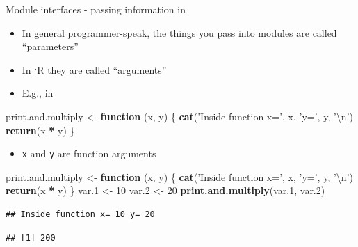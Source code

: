 \documentclass[ignorenonframetext,]{beamer}
\newenvironment{Shaded}{\begin{snugshade}}{\end{snugshade}}
\newcommand{\KeywordTok}[1]{\textcolor[rgb]{0.13,0.29,0.53}{\textbf{#1}}}
\newcommand{\DecValTok}[1]{\textcolor[rgb]{0.00,0.00,0.81}{#1}}
\newcommand{\CharTok}[1]{\textcolor[rgb]{0.31,0.60,0.02}{#1}}
\newcommand{\StringTok}[1]{\textcolor[rgb]{0.31,0.60,0.02}{#1}}
\newcommand{\ControlFlowTok}[1]{\textcolor[rgb]{0.13,0.29,0.53}{\textbf{#1}}}
\newcommand{\OperatorTok}[1]{\textcolor[rgb]{0.81,0.36,0.00}{\textbf{#1}}}
\newcommand{\NormalTok}[1]{#1}
\providecommand{\tightlist}{%
  \setlength{\itemsep}{0pt}\setlength{\parskip}{0pt}}
\begin{document}
\begin{frame}[fragile]{Module interfaces - passing information in}

\begin{itemize}[<+->]
\tightlist
\item
  In general programmer-speak, the things you pass into modules are
  called ``parameters''
\item
  In `R they are called ``arguments''
\item
  E.g., in
\end{itemize}

\begin{Shaded}
\begin{Highlighting}[]
\NormalTok{print.and.multiply <-}\StringTok{ }\ControlFlowTok{function}\NormalTok{ (x, y) \{}
    \KeywordTok{cat}\NormalTok{(}\StringTok{'Inside function x='}\NormalTok{, x, }\StringTok{'y='}\NormalTok{, y, }\StringTok{'}\CharTok{\textbackslash{}n}\StringTok{'}\NormalTok{)}
    \KeywordTok{return}\NormalTok{(x }\OperatorTok{*}\StringTok{ }\NormalTok{y)}
\NormalTok{\}}
\end{Highlighting}
\end{Shaded}

\begin{itemize}[<+->]
\tightlist
\item
  \texttt{x} and \texttt{y} are function arguments
\end{itemize}

\end{frame}

\begin{frame}[fragile]

\begin{Shaded}
\begin{Highlighting}[]
\NormalTok{print.and.multiply <-}\StringTok{ }\ControlFlowTok{function}\NormalTok{ (x, y) \{}
    \KeywordTok{cat}\NormalTok{(}\StringTok{'Inside function x='}\NormalTok{, x, }\StringTok{'y='}\NormalTok{, y, }\StringTok{'}\CharTok{\textbackslash{}n}\StringTok{'}\NormalTok{)}
    \KeywordTok{return}\NormalTok{(x }\OperatorTok{*}\StringTok{ }\NormalTok{y)}
\NormalTok{\}}
\NormalTok{var.}\DecValTok{1}\NormalTok{ <-}\StringTok{ }\DecValTok{10}
\NormalTok{var.}\DecValTok{2}\NormalTok{ <-}\StringTok{ }\DecValTok{20}
\KeywordTok{print.and.multiply}\NormalTok{(var.}\DecValTok{1}\NormalTok{, var.}\DecValTok{2}\NormalTok{)}
\end{Highlighting}
\end{Shaded}

\begin{verbatim}
## Inside function x= 10 y= 20
\end{verbatim}

\begin{verbatim}
## [1] 200
\end{verbatim}

\end{frame}
\end{document}
